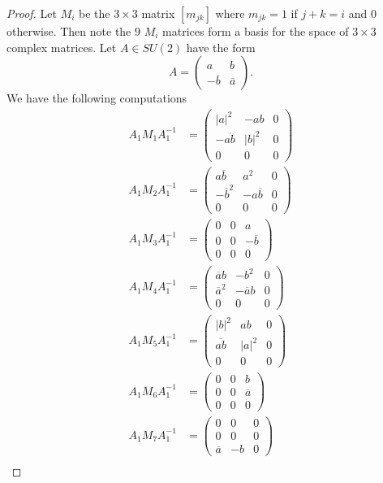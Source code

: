 \documentclass{article}
\begin{document}
\begin{proof}
Let $M_i$ be the $3 \times 3$ matrix $[m_{jk}]$ where $m_{jk} = 1$ if $j+k = i$ and $0$ otherwise. Then note the $9$ $M_i$ matrices form a basis for the space of $3 \times 3$ complex matrices. Let $A \in SU(2)$ have the form
\[
A = \left ( \begin{array}{cc} a & b\\ -\overline{b} & \overline{a} \end{array} \right ).
\]
We have the following computations
\begin{align*}
A_1 M_1 A_1^{-1} &= \left ( \begin{array}{ccc} |a|^2 & -ab & 0\\ -\overline{ab} & |b|^2 & 0\\ 0 & 0 & 0 \end{array} \right )\\
A_1 M_2 A_1^{-1} &= \left ( \begin{array}{ccc} a\overline{b} & a^2 & 0\\ -\overline{b}^2 & -a\overline{b} & 0\\ 0 & 0 & 0 \end{array} \right )\\
A_1 M_3 A_1^{-1} &= \left ( \begin{array}{ccc} 0 & 0 & a\\ 0 & 0 & -\overline{b}\\ 0 & 0 & 0 \end{array} \right )\\
A_1 M_4 A_1^{-1} &= \left ( \begin{array}{ccc} \overline{a}b & -b^2 & 0\\ \overline{a}^2 & -\overline{a}b & 0\\ 0 & 0 & 0 \end{array} \right )\\
A_1 M_5 A_1^{-1} &= \left ( \begin{array}{ccc} |b|^2 & ab & 0\\ \overline{ab} & |a|^2 & 0\\ 0 & 0 & 0 \end{array} \right )\\
A_1 M_6 A_1^{-1} &= \left ( \begin{array}{ccc} 0 & 0 & b\\ 0 & 0 & \overline{a}\\ 0 & 0 & 0 \end{array} \right )\\
A_1 M_7 A_1^{-1} &= \left ( \begin{array}{ccc} 0 & 0 & 0\\ 0 & 0 & 0\\ \overline{a} & -b & 0 \end{array} \right )\\

\end{align*}
\end{proof}
\end{document}
